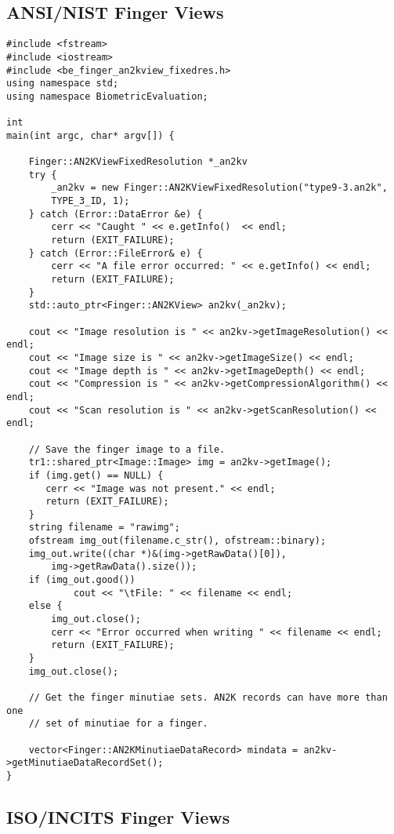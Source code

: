 \subsection{ANSI/NIST Finger Views}

\lstset{language=c++}
\begin{lstlisting}[caption={Using an AN2K Finger View}, label=an2kfingerviewuse]
#include <fstream>
#include <iostream>
#include <be_finger_an2kview_fixedres.h>
using namespace std;
using namespace BiometricEvaluation;

int
main(int argc, char* argv[]) {

    Finger::AN2KViewFixedResolution *_an2kv
    try {
        _an2kv = new Finger::AN2KViewFixedResolution("type9-3.an2k",
	    TYPE_3_ID, 1);
    } catch (Error::DataError &e) {
        cerr << "Caught " << e.getInfo()  << endl;
        return (EXIT_FAILURE);
    } catch (Error::FileError& e) {
        cerr << "A file error occurred: " << e.getInfo() << endl;
        return (EXIT_FAILURE);
    }
    std::auto_ptr<Finger::AN2KView> an2kv(_an2kv);

    cout << "Image resolution is " << an2kv->getImageResolution() << endl;
    cout << "Image size is " << an2kv->getImageSize() << endl;
    cout << "Image depth is " << an2kv->getImageDepth() << endl;
    cout << "Compression is " << an2kv->getCompressionAlgorithm() << endl;
    cout << "Scan resolution is " << an2kv->getScanResolution() << endl;

    // Save the finger image to a file.
    tr1::shared_ptr<Image::Image> img = an2kv->getImage();
    if (img.get() == NULL) {
       cerr << "Image was not present." << endl;
       return (EXIT_FAILURE);
    }
    string filename = "rawimg";
    ofstream img_out(filename.c_str(), ofstream::binary);
    img_out.write((char *)&(img->getRawData()[0]),
        img->getRawData().size());
    if (img_out.good())
            cout << "\tFile: " << filename << endl;
    else {
        img_out.close();
        cerr << "Error occurred when writing " << filename << endl;
        return (EXIT_FAILURE);
    }
    img_out.close();

    // Get the finger minutiae sets. AN2K records can have more than one
    // set of minutiae for a finger.

    vector<Finger::AN2KMinutiaeDataRecord> mindata = an2kv->getMinutiaeDataRecordSet();
}
\end{lstlisting}

\subsection{ISO/INCITS Finger Views}
